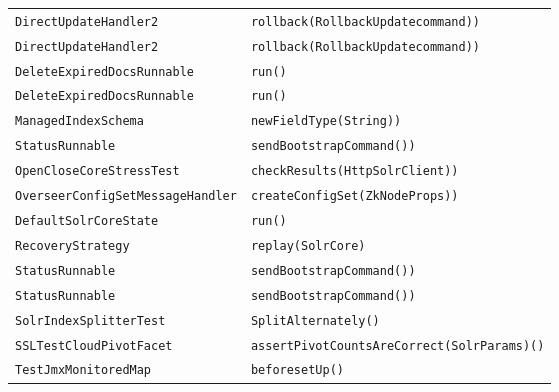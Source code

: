 \begin{center}
\begin{longtable}{ll}
\lstinline/DirectUpdateHandler2/&{\lstinline/rollback(RollbackUpdatecommand))/}\\
\lstinline/DirectUpdateHandler2/&{\lstinline/rollback(RollbackUpdatecommand))/}\\
\lstinline/DeleteExpiredDocsRunnable/&{\lstinline/run()/}\\
\lstinline/DeleteExpiredDocsRunnable/&{\lstinline/run()/}\\
\lstinline/ManagedIndexSchema/&{\lstinline/newFieldType(String))/}\\
\lstinline/StatusRunnable/&{\lstinline/sendBootstrapCommand())/}\\
\lstinline/OpenCloseCoreStressTest/&{\lstinline/checkResults(HttpSolrClient))/}\\
\lstinline/OverseerConfigSetMessageHandler/&{\lstinline/createConfigSet(ZkNodeProps))/}\\
\lstinline/DefaultSolrCoreState/&{\lstinline/run()/}\\
\lstinline/RecoveryStrategy/&{\lstinline/replay(SolrCore)/}\\
\lstinline/StatusRunnable/&{\lstinline/sendBootstrapCommand())/}\\
\lstinline/StatusRunnable/&{\lstinline/sendBootstrapCommand())/}\\
\lstinline/SolrIndexSplitterTest/&{\lstinline/SplitAlternately()/}\\
\lstinline/SSLTestCloudPivotFacet/&{\lstinline/assertPivotCountsAreCorrect(SolrParams)()/}\\
\lstinline/TestJmxMonitoredMap/&{\lstinline/beforesetUp()/}\\
\end{longtable}
\end{center}

